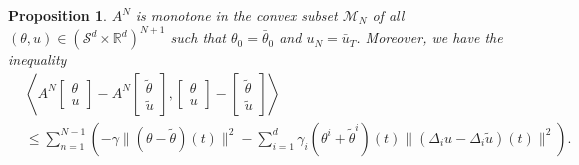 \documentclass[12pt]{amsart}
\newcommand{\Rr}{{\mathbb{R}}}
\newcommand{\1}{{\chi}}
\newcommand{\lb}{\left(}
\newcommand{\rb}{\right)}
\newcommand{\Ss}{\mathcal{S}}
\newtheorem{pro}{Proposition}
\theoremstyle{definition}
\begin{document}
\begin{pro}
$A^N$ is monotone in the convex subset 
 $\mathcal{M}_N$ of all $(\theta, u)\in (\Ss^d\times \Rr^d)^{N+1}$
such that $\theta_0=\bar \theta_0$ and $u_{N}=\bar u_T$.  Moreover, we have the inequality
\begin{align*}
&\left\langle A^N\left[\begin{array}{c}
\theta\\
u
\end{array}\right]-A^N\left[\begin{array}{c}
\tilde\theta\\
\tilde u
\end{array}\right],\left[\begin{array}{c}
\theta\\
u
\end{array}\right]-\left[\begin{array}{c}
\tilde\theta\\
\tilde u
\end{array}\right]\right\rangle
\\
&\leq \sum_{n=1}^{N-1} \lb -\gamma \|(\theta- \tilde \theta)(t) \|^2 - \sum_{i=1}^d \gamma_i (\theta^i + \tilde \theta^i)(t) \| (\Delta_i u - \Delta_i \tilde u)(t) \|^2 \rb.
\end{align*}    
\end{pro}       
\end{document}
